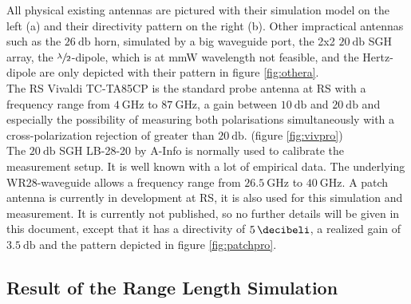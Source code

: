 All physical existing antennas are pictured with their simulation model on the left (a) and their directivity pattern on the right (b). Other impractical antennas such as the $\SI{26}{\decibel}$ horn, simulated by a big waveguide port, the 2x2 $\SI{20}{\decibel}$ \ac{SGH} array, the $\sfrac{\lambda}{2}$-dipole, which is at \ac{mmW} wavelength not feasible, and the Hertz-dipole are only depicted with their pattern in figure \ref{fig:othera}.\\
The \ac{RS} Vivaldi TC-TA85CP is the standard probe antenna at \ac{RS} with a frequency range from $\SI{4}{\giga\hertz}$ to $\SI{87}{\giga\hertz}$, a gain between $\SI{10}{\decibel}$ and $\SI{20}{\decibel}$ and especially the possibility of measuring both polarisations simultaneously with a cross-polarization rejection of greater than $\SI{20}{\decibel}$. (figure \ref{fig:vivpro})\\
The $\SI{20}{\decibel}$ \ac{SGH} LB-28-20 by A-Info is normally used to calibrate the measurement setup. It is well known with a lot of empirical data. The underlying WR28-waveguide allows a frequency range from $\SI{26.5}{\giga\hertz}$ to $\SI{40}{\giga\hertz}$. A patch antenna is currently in development at \ac{RS}, it is also used for this simulation and measurement. It is currently not published, so  no further details will be given in this document, except that it has a directivity of $\SI{5}{\decibeli}$, a realized gain of $\SI{3.5}{\decibel}$ and the pattern depicted in figure \ref{fig:patchpro}. 

\subsection{Result of the Range Length Simulation}

